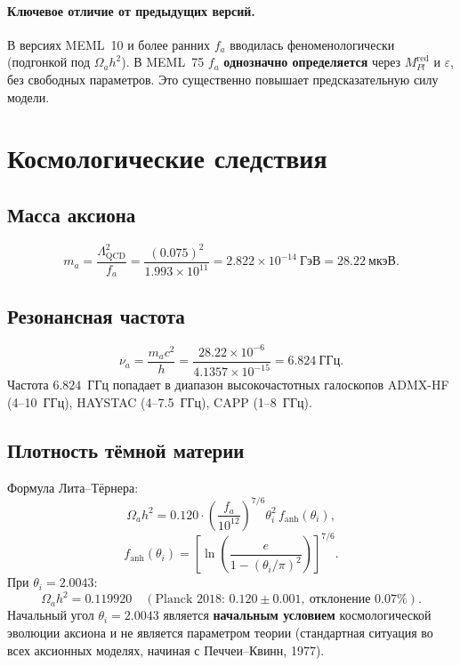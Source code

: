 \documentclass[12pt,a4paper]{article}
\numberwithin{equation}{section}
\begin{document}
\paragraph{Ключевое отличие от предыдущих версий.}
В версиях MEML~10 и более ранних $f_a$ вводилась феноменологически 
(подгонкой под $\Omega_a h^2$). В MEML~75 $f_a$ \textbf{однозначно 
определяется} через $M_{Pl}^{\text{red}}$ и $\varepsilon$, без 
свободных параметров. Это существенно повышает предсказательную 
силу модели.

\section{Космологические следствия}

\subsection{Масса аксиона}
\begin{equation}
m_a = \frac{\Lambda_{\text{QCD}}^2}{f_a} 
= \frac{(0.075)^2}{1.993\times 10^{11}} 
= 2.822\times 10^{-14}~\text{ГэВ} = 28.22~\text{мкэВ}.
\end{equation}

\subsection{Резонансная частота}
\begin{equation}
\boxed{\;\nu_a = \frac{m_a c^2}{h} 
= \frac{28.22\times 10^{-6}}{4.1357\times 10^{-15}} 
= 6.824~\text{ГГц}.\;}
\end{equation}
Частота $6.824$~ГГц попадает в диапазон высокочастотных галоскопов 
ADMX-HF (4--10~ГГц), HAYSTAC (4--7.5~ГГц), CAPP (1--8~ГГц).

\subsection{Плотность тёмной материи}
Формула Лита--Тёрнера:
\begin{equation}
\Omega_a h^2 = 0.120\cdot 
\left(\frac{f_a}{10^{12}}\right)^{7/6}\theta_i^2\,f_{\text{anh}}(\theta_i),
\end{equation}
\begin{equation}
f_{\text{anh}}(\theta_i) = 
\left[\ln\!\left(\frac{e}{1-(\theta_i/\pi)^2}\right)\right]^{7/6}.
\end{equation}
При $\theta_i = 2.0043$:
\begin{equation}
\boxed{\;\Omega_a h^2 = 0.119920 \quad (\text{Planck 2018: } 
0.120 \pm 0.001,\ \text{отклонение } 0.07\%).\;}
\end{equation}
Начальный угол $\theta_i = 2.0043$ является \textbf{начальным условием} 
космологической эволюции аксиона и не является параметром теории 
(стандартная ситуация во всех аксионных моделях, начиная с 
Печчеи--Квинн, 1977).
\end{document}
